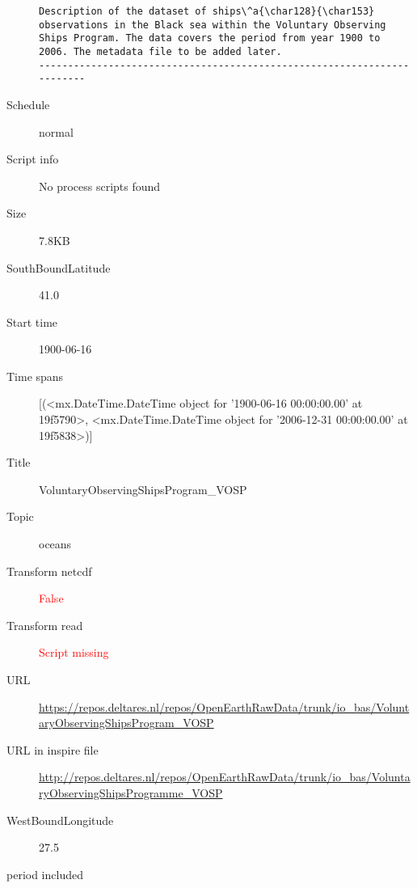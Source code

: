 \documentclass[9]{report}
\begin{document}
\begin{description}
\begin{verbatim}
Description of the dataset of ships\^a{\char128}{\char153} observations in the Black sea within the Voluntary Observing Ships Program. The data covers the period from year 1900 to 2006. The metadata file to be added later.
------------------------------------------------------------------------

\end{verbatim}
  \item[Schedule] normal
  \item[Script info] No process scripts found
  \item[Size] 7.8KB
  \item[SouthBoundLatitude] 41.0
  \item[Start time] 1900-06-16
  \item[Time spans] [(<mx.DateTime.DateTime object for '1900-06-16 00:00:00.00' at 19f5790>, <mx.DateTime.DateTime object for '2006-12-31 00:00:00.00' at 19f5838>)]
  \item[Title]  VoluntaryObservingShipsProgram\_VOSP 
  \item[Topic] oceans
  \item[Transform netcdf] \textcolor{red}{False}
  \item[Transform read] \textcolor{red}{Script missing}
  \item[URL] \href{https://repos.deltares.nl/repos/OpenEarthRawData/trunk/io\_bas/VoluntaryObservingShipsProgram\_VOSP}{https://repos.deltares.nl/repos/OpenEarthRawData/trunk/io\_bas/VoluntaryObservingShipsProgram\_VOSP}
  \item[URL in inspire file] \href{http://repos.deltares.nl/repos/OpenEarthRawData/trunk/io\_bas/VoluntaryObservingShipsProgramme\_VOSP}{http://repos.deltares.nl/repos/OpenEarthRawData/trunk/io\_bas/VoluntaryObservingShipsProgramme\_VOSP}
  \item[WestBoundLongitude] 27.5
  \item[period included] 
\end{description}
\end{document}
